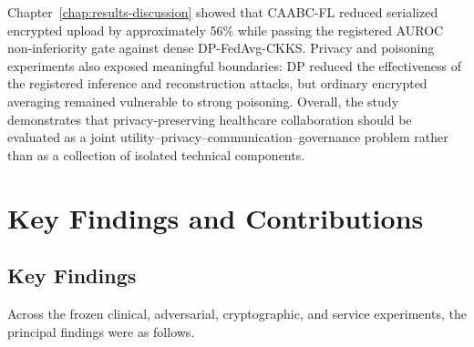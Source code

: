 Chapter~\ref{chap:results-discussion} showed that CAABC-FL reduced serialized encrypted upload by approximately 56\% while passing the registered AUROC non-inferiority gate against dense DP-FedAvg-CKKS. Privacy and poisoning experiments also exposed meaningful boundaries: DP reduced the effectiveness of the registered inference and reconstruction attacks, but ordinary encrypted averaging remained vulnerable to strong poisoning. Overall, the study demonstrates that privacy-preserving healthcare collaboration should be evaluated as a joint utility--privacy--communication--governance problem rather than as a collection of isolated technical components.

\section{Key Findings and Contributions}
\label{sec:key-findings-contributions}

\subsection{Key Findings}

Across the frozen clinical, adversarial, cryptographic, and service experiments, the principal findings were as follows.

